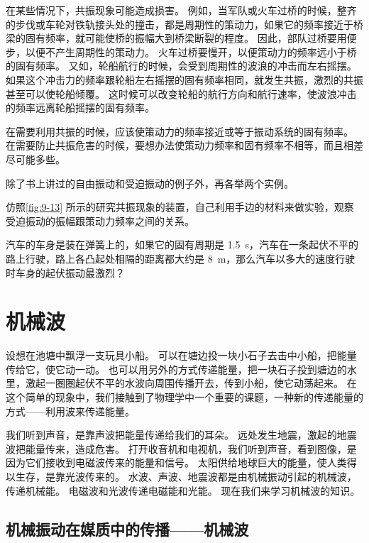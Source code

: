 在某些情况下，共振现象可能造成损害。
例如，当军队或火车过桥的时候，整齐的步伐或车轮对铁轨接头处的撞击，都是周期性的策动力，如果它的频率接近于桥梁的固有频率，就可能使桥的振幅大到桥梁断裂的程度。
因此，部队过桥要用便步，以便不产生周期性的策动力。
火车过桥要慢开，以便策动力的频率远小于桥的固有频率。
又如，轮船航行的时候，会受到周期性的波浪的冲击而左右摇摆。
如果这个冲击力的频率跟轮船左右摇摆的固有频率相同，就发生共振，激烈的共振甚至可以使轮船倾覆。
这时候可以改变轮船的航行方向和航行速率，使波浪冲击的频率远离轮船摇摆的固有频率。

在需要利用共振的时候，应该使策动力的频率接近或等于振动系统的固有频率。
在需要防止共振危害的时候，要想办法使策动力频率和固有频率不相等，而且相差尽可能多些。

\begin{Practice}
\begin{question}
  \item 除了书上讲过的自由振动和受迫振动的例子外，再各举两个实例。
  \item 仿照\cref{fig:9-13} 所示的研究共振现象的装置，自己利用手边的材料来做实验，观察受迫振动的振幅跟策动力频率之间的关系。
  \item 汽车的车身是装在弹簧上的，如果它的固有周期是 \qty{1.5}{s}，汽车在一条起伏不平的路上行驶，路上各凸起处相隔的距离都大约是 \qty{8}{m}，那么汽车以多大的速度行驶时车身的起伏振动最激烈？
\end{question}
\end{Practice}


\section{机械波}
设想在池塘中飘浮一支玩具小船。
可以在塘边投一块小石子去击中小船，把能量传给它，使它动一动。
也可以用另外的方式传递能量，把一块石子投到塘边的水里，激起一圈圈起伏不平的水波向周围传播开去，传到小船，使它动荡起来。
在这个简单的现象中，我们接触到了物理学中一个重要的课题，一种新的传递能量的方式——利用波来传递能量。

我们听到声音，是靠声波把能量传递给我们的耳朵。
远处发生地震，激起的地震波把能量传来，造成危害。
打开收音机和电视机，我们听到声音，看到图像，是因为它们接收到电磁波传来的能量和信号。
太阳供给地球巨大的能量，使人类得以生存，是靠光波传来的。
水波、声波、地震波都是由机械振动引起的机械波，传递机械能。
电磁波和光波传递电磁能和光能。
现在我们来学习机械波的知识。

\subsection{机械振动在媒质中的传播——机械波}
